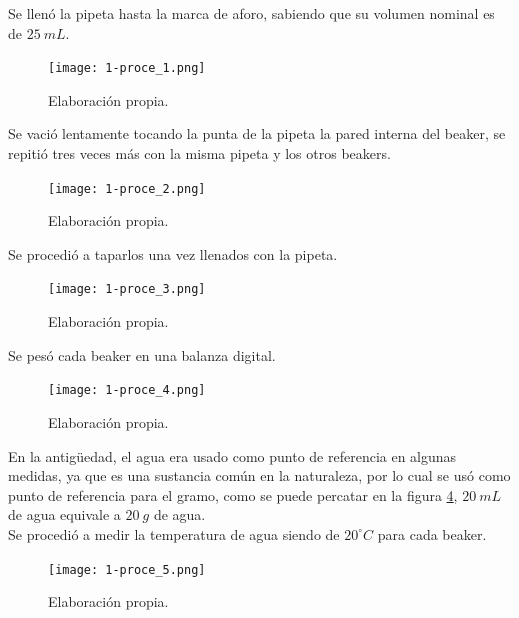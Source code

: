 \documentclass[12pt,letterpaper]{exam}
\begin{document}
\begin{multicols}{2}

Se llenó la pipeta hasta la marca de aforo, sabiendo que su volumen nominal es de $25 \ mL$.


\begin{figure}[H]
\centering
\texttt{[image: 1-proce\_1.png]}
\caption{Elaboración propia.}
\label{fig:1-proce_1}
\end{figure}

Se vació lentamente tocando la punta de la pipeta la pared interna del beaker, se repitió tres veces más con la misma pipeta y los otros beakers.

\begin{figure}[H]
\centering
\texttt{[image: 1-proce\_2.png]}
\caption{Elaboración propia.}
\label{fig:1-proce_2}
\end{figure}

Se procedió a taparlos una vez llenados con la pipeta.

\begin{figure}[H]
\centering
\texttt{[image: 1-proce\_3.png]}
\caption{Elaboración propia.}
\label{fig:1-proce_3}
\end{figure}

Se pesó cada beaker en una balanza digital.

\begin{figure}[H]
\centering
\texttt{[image: 1-proce\_4.png]}
\caption{Elaboración propia.}
\label{fig:1-proce_4}
\end{figure}

En la antigüedad, el agua era usado como punto de referencia en algunas medidas, ya que es una sustancia común en la naturaleza, por lo cual se usó como punto de referencia para el gramo, como se puede percatar en la figura \ref{fig:1-proce_4}, $20 \ mL$ de agua equivale a $20 \ g$ de agua.\\

Se procedió a medir la temperatura de agua siendo de $20^{\circ}C$ para cada beaker.

\begin{figure}[H]
\centering
\texttt{[image: 1-proce\_5.png]}
\caption{Elaboración propia.}
\label{fig:1-proce_5}
\end{figure}

\end{multicols}






\end{document}
